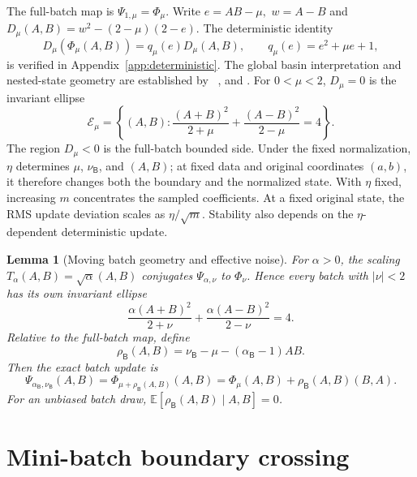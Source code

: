 \documentclass[11pt]{article}
\newtheorem{lemma}[theorem]{Lemma}
\newcommand{\E}{\mathbb E}
\newcommand{\Ecal}{\mathcal E}
\begin{document}
The full-batch map is \(\Psi_{1,\mu}=\Phi_\mu\).  Write $e=AB-\mu,$ $w=A-B$ and $D_\mu(A,B)=w^2-(2-\mu)(2-e).$ The deterministic identity
\begin{equation}
\label{eq:D-deterministic}
    D_\mu(\Phi_\mu(A,B))
    =
    q_\mu(e)D_\mu(A,B),
    \qquad q_\mu(e)=e^2+\mu e+1,
\end{equation}
is verified in Appendix~\ref{app:deterministic}.  The global basin
interpretation and nested-state geometry are established by
~\citet{chen2023stability}, \citet{liang2026gradient} and \citet{moon2026state}.  For \(0<\mu<2\),
\(D_\mu=0\) is the invariant ellipse
\begin{equation}
\label{eq:ellipse}
    \Ecal_\mu
    =
    \left\{(A,B):
    \frac{(A+B)^2}{2+\mu}
    +
    \frac{(A-B)^2}{2-\mu}=4
    \right\}.
\end{equation}
The region \(D_\mu<0\) is the full-batch bounded side.  Under the fixed
normalization, \(\eta\) determines \(\mu\), \(\nu_{\mathsf B}\), and
\((A,B)\); at fixed data and original coordinates \((a,b)\), it therefore
changes both the boundary and the normalized state.  With \(\eta\) fixed,
increasing \(m\) concentrates the sampled coefficients.  At a fixed
original state, the RMS update deviation scales as \(\eta/\sqrt m\).
Stability also depends on the \(\eta\)-dependent deterministic update.

\begin{lemma}[Moving batch geometry and effective noise]
\label{thm:moving-geometry}
For \(\alpha>0\), the scaling
\(T_\alpha(A,B)=\sqrt\alpha(A,B)\) conjugates
\(\Psi_{\alpha,\nu}\) to \(\Phi_\nu\).  Hence every batch with
\(|\nu|<2\) has its own invariant ellipse
\[
    \frac{\alpha(A+B)^2}{2+\nu}
    +
    \frac{\alpha(A-B)^2}{2-\nu}=4.
\]
Relative to the full-batch map, define
\begin{equation}
\label{eq:rho}
    \rho_{\mathsf B}(A,B)
    =
    \nu_{\mathsf B}-\mu
    -
    (\alpha_{\mathsf B}-1)AB.
\end{equation}
Then the exact batch update is
\begin{equation}
\label{eq:Psi-rho}
    \Psi_{\alpha_{\mathsf B},\nu_{\mathsf B}}(A,B)
    =
    \Phi_{\mu+\rho_{\mathsf B}(A,B)}(A,B)
    =
    \Phi_\mu(A,B)+\rho_{\mathsf B}(A,B)(B,A).
\end{equation}
For an unbiased batch draw,
\(\E[\rho_{\mathsf B}(A,B)\mid A,B]=0\).
\end{lemma}

\section{Mini-batch boundary crossing}
\label{sec:crossing}
\end{document}
